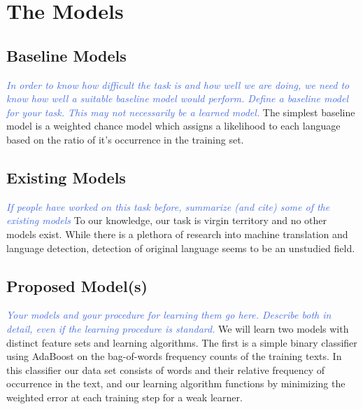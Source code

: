 \documentclass[11pt,letterpaper]{article}
\newcommand{\blue}[1]{\textcolor{RoyalBlue}{#1}}
\newcommand{\instructions}[1]{\blue{\textit{#1}}}
\begin{document}
\section{The Models}
\label{sec:models}
\subsection{Baseline Models}
\label{sec:baseline-models}
\instructions{In order to know how difficult the task is and how well we are doing, we need to know how well a suitable baseline model would perform. Define a baseline model for your task. This may not necessarily be a learned model.}
The simplest baseline model is a weighted chance model which assigns a likelihood to each language based on the ratio of it’s occurrence in the training set.
\subsection{Existing Models}
\label{sec:existing-models}
\instructions{If people have worked on this task before, summarize (and cite) some of the existing models}
To our knowledge, our task is virgin territory and no other models exist.  While there is a plethora of research into machine translation and language detection, detection of original language seems to be an unstudied field.
\subsection{Proposed Model(s)}
\label{sec:proposed-models}
\instructions{Your models and your procedure for learning them go here. Describe both in detail, even if the learning procedure is standard.} We will learn two models with distinct feature sets and learning algorithms.  The first is a simple binary classifier using AdaBoost on the bag-of-words frequency counts of the training texts.  In this classifier our data set consists of words and their relative frequency of occurrence in the text, and our learning algorithm functions by minimizing the weighted error at each training step for a weak learner.  \\
\end{document}
